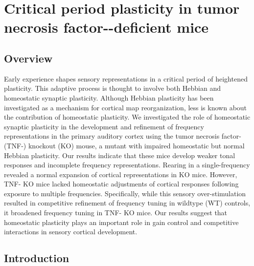 \chapter{Critical period plasticity in tumor necrosis factor-\textalpha{}-deficient mice}

\section{Overview}
\newrefsection

Early experience shapes sensory representations in a critical period of heightened plasticity. This adaptive process is thought to involve both Hebbian and homeostatic synaptic plasticity. Although Hebbian plasticity has been investigated as a mechanism for cortical map reorganization, less is known about the contribution of homeostatic plasticity. We investigated the role of homeostatic synaptic plasticity in the development and refinement of frequency representations in the primary auditory cortex using the tumor necrosis factor-\textalpha{} (TNF-\textalpha{}) knockout (KO) mouse, a mutant with impaired homeostatic but normal Hebbian plasticity. Our results indicate that these mice develop weaker tonal responses and incomplete frequency representations. Rearing in a single-frequency revealed a normal expansion of cortical representations in KO mice. However, TNF-\textalpha{} KO mice lacked homeostatic adjustments of cortical responses following exposure to multiple frequencies. Specifically, while this sensory over-stimulation resulted in competitive refinement of frequency tuning in wildtype (WT) controls, it broadened frequency tuning in TNF-\textalpha{} KO mice. Our results suggest that homeostatic plasticity plays an important role in gain control and competitive interactions in sensory cortical development.

\section{Introduction}

